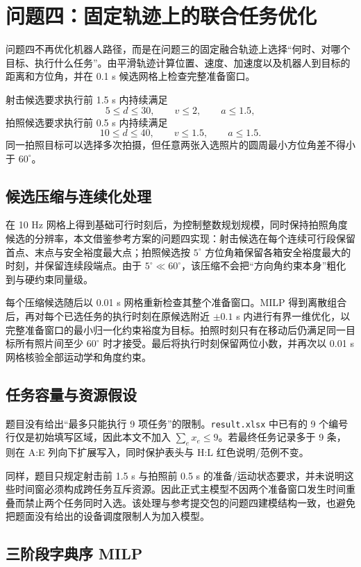 \section{问题四：固定轨迹上的联合任务优化}

问题四不再优化机器人路径，而是在问题三的固定融合轨迹上选择“何时、对哪个目标、执行什么任务”。由平滑轨迹计算位置、速度、加速度以及机器人到目标的距离和方位角，并在 0.1 s 候选网格上检查完整准备窗口。

射击候选要求执行前 1.5 s 内持续满足
\[
5\le d\le30,\qquad v\le2,\qquad a\le1.5,
\]
拍照候选要求执行前 0.5 s 内持续满足
\[
10\le d\le40,\qquad v\le1.5,\qquad a\le1.5.
\]
同一拍照目标可以选择多次拍摄，但任意两张入选照片的圆周最小方位角差不得小于 $60^\circ$。

\subsection{候选压缩与连续化处理}

在 10 Hz 网格上得到基础可行时刻后，为控制整数规划规模，同时保持拍照角度候选的分辨率，本文借鉴参考方案的问题四实现：射击候选在每个连续可行段保留首点、末点与安全裕度最大点；拍照候选按 $5^\circ$ 方位角箱保留各箱安全裕度最大的时刻，并保留连续段端点。由于 $5^\circ\ll60^\circ$，该压缩不会把“方向角约束本身”粗化到与硬约束同量级。

每个压缩候选随后以 0.01 s 网格重新检查其整个准备窗口。MILP 得到离散组合后，再对每个已选任务的执行时刻在原候选附近 $\pm0.1$ s 内进行有界一维优化，以完整准备窗口的最小归一化约束裕度为目标。拍照时刻只有在移动后仍满足同一目标所有照片间至少 $60^\circ$ 时才接受。最后将执行时刻保留两位小数，并再次以 0.01 s 网格核验全部运动学和角度约束。

\subsection{任务容量与资源假设}

题目没有给出“最多只能执行 9 项任务”的限制。\texttt{result.xlsx} 中已有的 9 个编号行仅是初始填写区域，因此本文不加入 $\sum_e x_e\le9$。若最终任务记录多于 9 条，则在 A:E 列向下扩展写入，同时保护表头与 H:L 红色说明/范例不变。

同样，题目只规定射击前 1.5 s 与拍照前 0.5 s 的准备/运动状态要求，并未说明这些时间窗必须构成跨任务互斥资源。因此正式主模型不因两个准备窗口发生时间重叠而禁止两个任务同时入选。该处理与参考提交包的问题四建模结构一致，也避免把题面没有给出的设备调度限制人为加入模型。

\subsection{三阶段字典序 MILP}

